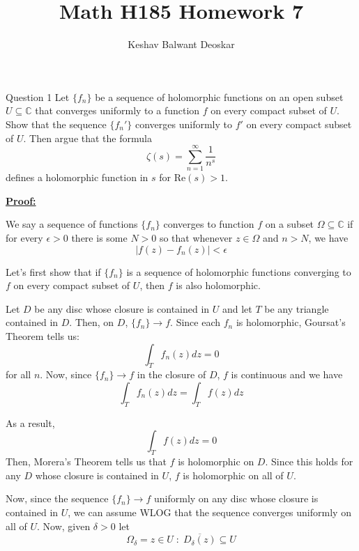 \documentclass{article}
\title{Math H185 Homework 7}
\author{Keshav Balwant Deoskar}
\newcommand{\C}{\mathbb{C}}
\begin{document}
\maketitle


\begin{mathdefinitionbox}{Question 1}
\vskip 0.25cm
Let $\{f_n\}$ be a sequence of holomorphic functions on an open subset $U \subseteq \C$ that converges uniformly to a function $f$ on every compact subset of $U$. Show that the sequence $\{f_n'\}$ converges uniformly to $f'$ on every compact subset of $U$. Then argue that the formula
\[ \zeta(s) = \sum_{n = 1}^{\infty} \frac{1}{n^s}  \]
defines a holomorphic function in $s$ for $\text{Re}(s) > 1$.
\end{mathdefinitionbox}

\vskip 0.5cm
\underline{\textbf{Proof:}}

\vskip 0.5cm
We say a sequence of functions $\{f_n\}$ converges to function $f$ on a subset $\Omega \subseteq \C$ if for every $\epsilon > 0$ there is some $N > 0$ so that whenever $z \in \Omega$ and $n > N$, we have 
\[ \left| f(z) - f_n(z) \right| < \epsilon  \]

\vskip 0.25cm
Let's first show that if $\{f_n\}$ is a sequence of holomorphic functions converging to $f$ on every compact subset of $U$, then $f$ is also holomorphic.

\begin{dottedbox}
  Let $D$ be any disc whose closure is contained in $U$ and let $T$ be any triangle contained in $D$. Then, on $D$, $\{f_n\} \rightarrow f$. Since each $f_n$ is holomorphic, Goursat's Theorem tells us:
  \[ \int_{T} f_n(z) dz = 0 \]
  for all $n$. Now, since $\{f_n\} \rightarrow f$ in the closure of $D$, $f$ is continuous and we have 
  \[ \int_{T} f_n(z) dz = \int_{T} f(z) dz \]

  As a result,
  \[ \int_{T} f(z) dz = 0 \]
  Then, Morera's Theorem tells us that $f$ is holomorphic on $D$. Since this holds for any $D$ whose closure is contained in $U$, $f$ is holomorphic on all of $U$.
\end{dottedbox}

\vskip 0.5cm
Now, since the sequence $\{f_n\} \rightarrow f$ uniformly on any disc whose closure is contained in $U$, we can assume WLOG that the sequence converges uniformly on all of $U$. Now, given $\delta > 0$ let 
\[ \Omega_{\delta} = {z \in U\;:\; \overline{D_{\delta}(z)} \subseteq U}  \]
\end{document}
